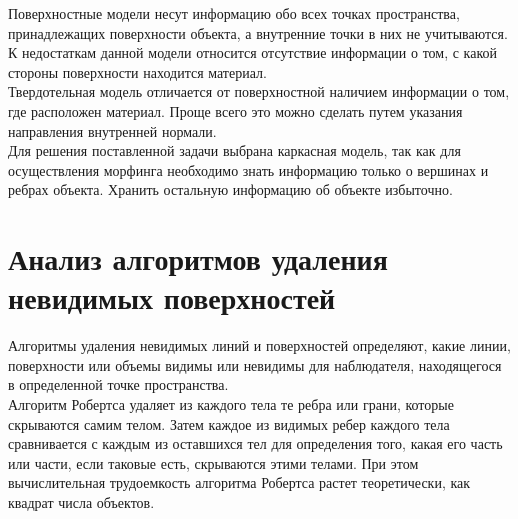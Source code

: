 Поверхностные модели несут информацию обо всех точках
пространства, принадлежащих поверхности объекта, а внутренние точки в них
не учитываются. К недостаткам данной модели относится отсутствие информации о том, с какой стороны поверхности находится материал.\\ %


Твердотельная модель отличается от поверхностной наличием информации о том, где расположен материал. Проще всего это можно сделать путем указания направления внутренней нормали.~\cite{Kosnikov}\\


Для решения поставленной задачи выбрана каркасная модель, так как для осуществления морфинга необходимо знать информацию только о вершинах и ребрах объекта. Хранить остальную информацию об объекте избыточно. 

\newpage

\section{Анализ алгоритмов удаления невидимых поверхностей}

Алгоритмы удаления невидимых линий и поверхностей определяют, какие линии, поверхности или объемы видимы или невидимы для наблюдателя, находящегося в определенной точке пространства.\\


Алгоритм Робертса удаляет из каждого тела те ребра или грани, которые скрываются самим телом. Затем каждое из видимых ребер каждого тела сравнивается с каждым из оставшихся тел для определения того, какая его часть или части, если таковые есть, скрываются этими телами. При этом вычислительная трудоемкость алгоритма Робертса растет теоретически, как квадрат числа объектов.\\ %

